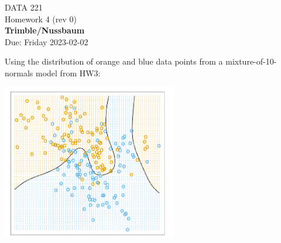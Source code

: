 \documentclass[12pt]{book}
\theoremstyle{definition}
\begin{document}
\begin{center}
{\Large DATA 221 \\  Homework 4  (rev 0)}\\
\textbf{Trimble/Nussbaum}\\ %
Due: Friday 2023-02-02 
\end{center}

\vspace{0.2 cm}

Using the distribution of orange and blue data points from a mixture-of-10-normals model from HW3:

\includegraphics[width=3in]{src/hastie-bayesian.png}
\end{document}
